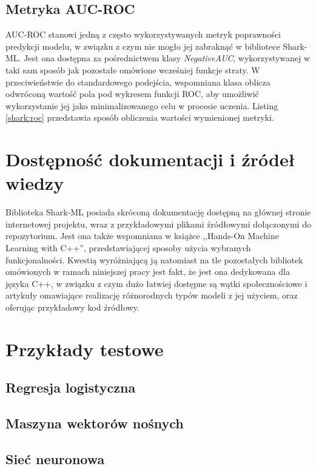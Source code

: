 
\subsection{Metryka AUC-ROC}

AUC-ROC stanowi jedną z często wykorzystywanych metryk poprawności predykcji modelu, w związku z czym nie mogło jej zabraknąć w bibliotece Shark-ML. Jest ona dostępna za pośrednictwem klasy \textit{NegativeAUC}, wykorzystywanej w taki sam sposób jak pozostałe omówione wcześniej funkcje straty. W przeciwieństwie do standardowego podejścia, wspomniana klasa oblicza odwróconą wartość pola pod wykresem funkcji ROC, aby umożliwić wykorzystanie jej jako minimalizowanego celu w procesie uczenia. Listing \ref{shark:roc} przedstawia sposób obliczenia wartości wymienionej metryki.



\section{Dostępność dokumentacji i źródeł wiedzy}

Biblioteka Shark-ML posiada skróconą dokumentację dostępną na głównej stronie internetowej projektu, wraz z przykładowymi plikami źródłowymi dołączonymi do repozytorium. Jest ona także wspomniana w książce ,,Hands-On Machine Learning with C++'', przedstawiającej sposoby użycia wybranych funkcjonalności. Kwestią wyróżniającą ją natomiast na tle pozostałych bibliotek omówionych w ramach niniejszej pracy jest fakt, że jest ona dedykowana dla języka C++, w związku z czym dużo łatwiej dostępne są wątki społecznościowe i artykuły omawiające realizację różnorodnych typów modeli z jej użyciem, oraz oferując przykładowy kod źródłowy.

\section{Przykłady testowe}
\subsection{Regresja logistyczna}
\subsection{Maszyna wektorów nośnych}
\subsection{Sieć neuronowa}